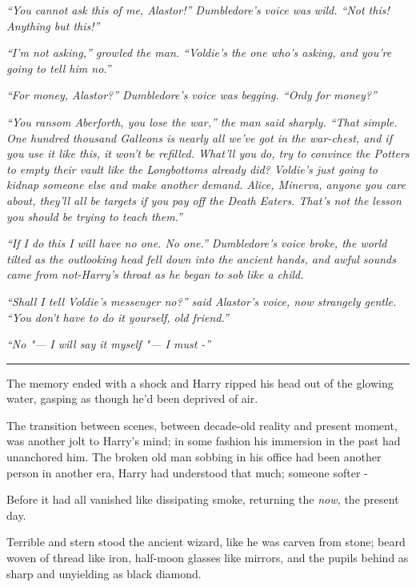 \emph{``You cannot ask this of me, Alastor!'' Dumbledore's voice was
wild. ``Not this! Anything but this!''}

\emph{``I'm not asking,'' growled the man. ``Voldie's the one who's
asking, and you're going to tell him no.''}

\emph{``For money, Alastor?'' Dumbledore's voice was begging. ``Only for
money?''}

\emph{``You ransom Aberforth, you lose the war,'' the man said sharply.
``That simple. One hundred thousand Galleons is nearly all we've got in
the war-chest, and if you use it like this, it won't be refilled.
What'll you do, try to convince the Potters to empty their vault like
the Longbottoms already did? Voldie's just going to kidnap someone else
and make another demand. Alice, Minerva, anyone you care about, they'll
all be targets if you pay off the Death Eaters. That's not the lesson
you should be trying to teach them.''}

\emph{``If I do this I will have no one. No one.'' Dumbledore's voice
broke, the world tilted as the outlooking head fell down into the
ancient hands, and awful sounds came from not-Harry's throat as he began
to sob like a child.}

\emph{``Shall I tell Voldie's messenger no?'' said Alastor's voice, now
strangely gentle. ``You don't have to do it yourself, old friend.''}

\emph{``No "--- I will say it myself "--- I must -''}

\begin{center}\rule{3in}{0.4pt}\end{center}

The memory ended with a shock and Harry ripped his head out of the
glowing water, gasping as though he'd been deprived of air.

The transition between scenes, between decade-old reality and present
moment, was another jolt to Harry's mind; in some fashion his immersion
in the past had unanchored him. The broken old man sobbing in his office
had been another person in another era, Harry had understood that much;
someone softer -

Before it had all vanished like dissipating smoke, returning the
\emph{now,} the present day.

Terrible and stern stood the ancient wizard, like he was carven from
stone; beard woven of thread like iron, half-moon glasses like mirrors,
and the pupils behind as sharp and unyielding as black diamond.

